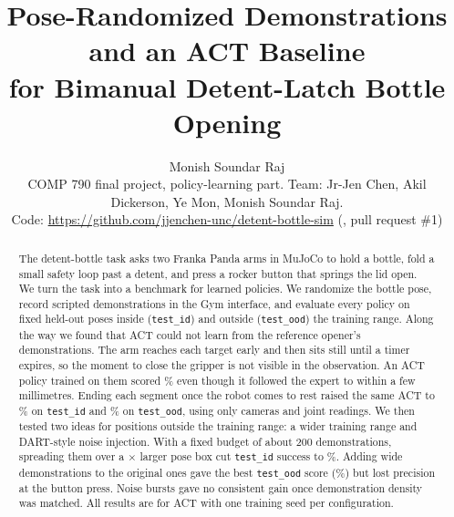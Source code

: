 \documentclass[10pt,twocolumn,letterpaper]{article}
\title{\Large Pose-Randomized Demonstrations and an ACT Baseline\\for Bimanual Detent-Latch Bottle Opening}
\author{Monish Soundar Raj\\[2pt]
\small COMP 790 final project, policy-learning part. Team: Jr-Jen Chen, Akil Dickerson, Ye Mon, Monish Soundar Raj.\\
\small Code: \url{https://github.com/jjenchen-unc/detent-bottle-sim} (\ttt{bench/}, pull request \#1)}
\date{}
\newcommand{\ttt}[1]{\texttt{\small #1}}
\begin{document}
\maketitle

\begin{abstract}
The detent-bottle task asks two Franka Panda arms in MuJoCo to hold a bottle, fold a small safety loop past a
detent, and press a rocker button that springs the lid open. We turn the task into a benchmark for learned
policies. We randomize the bottle pose, record scripted demonstrations in the Gym interface, and evaluate every
policy on fixed held-out poses inside (\ttt{test\_id}) and outside (\ttt{test\_ood}) the training range. Along
the way we found that ACT could not learn from the reference opener's demonstrations. The arm reaches each
target early and then sits still until a timer expires, so the moment to close the gripper is not visible in the
observation. An ACT policy trained on them scored \TimedId\% even though it followed the expert to within a few
millimetres. Ending each segment once the robot comes to rest raised the same ACT to \VtwoId\% on
\ttt{test\_id} and \VtwoOod\% on \ttt{test\_ood}, using only cameras and joint readings. We then tested two
ideas for positions outside the training range: a wider training range and DART-style noise injection. With a
fixed budget of about 200 demonstrations, spreading them over a \WideVolume$\times$ larger pose box cut
\ttt{test\_id} success to \AId\%. Adding wide demonstrations to the original ones gave the best \ttt{test\_ood}
score (\COod\%) but lost precision at the button press. Noise bursts gave no consistent gain once demonstration
density was matched. All results are for ACT with one training seed per configuration.
\end{abstract}
\end{document}
